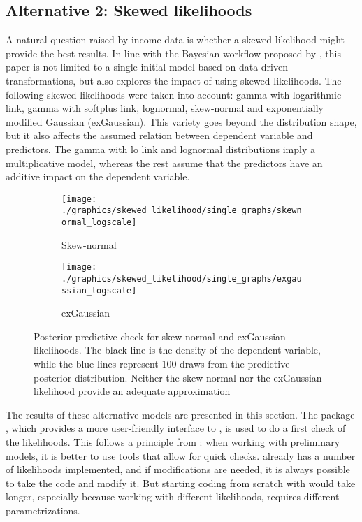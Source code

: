 \subsection{Alternative 2: Skewed likelihoods}
\label{ch:skewed_likelihoods}
A natural question raised by income data is whether a skewed likelihood might provide the best results.
In line with the Bayesian workflow proposed by \cite{gelman_bayesian_2020}, this paper is not limited to a single initial model based on data-driven transformations, but also explores the impact of using skewed likelihoods.
The following skewed likelihoods were taken into account: gamma with logarithmic link, gamma with
softplus link, lognormal, skew-normal and exponentially modified Gaussian (exGaussian).
This variety goes beyond the distribution shape, but it also affects the assumed relation between dependent variable and predictors.
The gamma with lo link and lognormal distributions imply a multiplicative model, whereas the rest assume that the predictors have an additive impact on the dependent variable.

\begin{figure}[h]
    \centering
    \begin{subfigure}{0.45\linewidth}
        \texttt{[image: ./graphics/skewed\_likelihood/single\_graphs/skewnormal\_logscale]}
        \caption{Skew-normal}
    \end{subfigure}
    \begin{subfigure}{0.45\linewidth}
        \texttt{[image: ./graphics/skewed\_likelihood/single\_graphs/exgaussian\_logscale]}
        \caption{exGaussian}
    \end{subfigure}

    \caption[Posterior predictive check for skew-normal and exGaussian likelihoods.]{Posterior predictive check for skew-normal and exGaussian likelihoods. The black line is the density of the dependent variable, while the blue lines represent 100 draws from the predictive posterior distribution. Neither the skew-normal nor the exGaussian likelihood provide an adequate approximation }
    \label{fig:logscale_misfit}
\end{figure}

The results of these alternative models are presented in this section.
The package  \citep{burkner_brms_2017}, which provides a more user-friendly interface to , is used to do a first check of the likelihoods.
This follows a principle from \cite{gelman_bayesian_2020}: when working with preliminary models, it is better to use tools that allow for quick checks.
 already has a number of likelihoods implemented, and if modifications are needed, it is always possible to take the  code and modify it.
But starting coding from scratch with  would take longer, especially because working with different likelihoods, requires different parametrizations.

